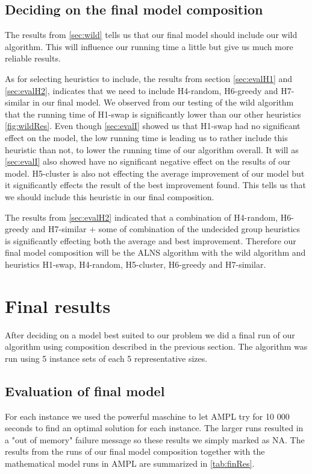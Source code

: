 \documentclass[../main.tex]{subfiles}
\begin{document}
\subsection{Deciding on the final model composition}
\label{sec:finComp}
The results from \cref{sec:wild} tells us that our final model should include our wild algorithm. 
This will influence our running time a little but give us much more reliable results.
\par
As for selecting heuristics to include, the results from section \cref{sec:evalH1} and \cref{sec:evalH2}, indicates that we need to include H4-random, H6-greedy and H7-similar in our final model.
We observed from our testing of the wild algorithm that the running time of H1-swap is significantly lower than our other heuristics \cref{fig:wildRes}. Even though \cref{sec:evalI} showed us that H1-swap had no significant effect on the model, the low running time is leading us to rather include this heuristic than not, to lower the running time of our algorithm overall.
It will as \cref{sec:evalI} also showed have no significant negative effect on the results of our model.
H5-cluster is also not effecting the average improvement of our model but it significantly effects the result of the best improvement found. This tells us that we should include this heuristic in our final composition. \par
The results from \cref{sec:evalH2} indicated that a combination of H4-random, H6-greedy and H7-similar + some of combination of the undecided group heuristics is significantly effecting both the average and best improvement. Therefore our final model composition will be the ALNS algorithm with the wild algorithm and heuristics H1-swap, H4-random, H5-cluster, H6-greedy and H7-similar.

\section{Final results}
\label{sec:evalFin}
After deciding on a model best suited to our problem we did a final run of our algorithm using composition described in the previous section.
The algorithm was run using 5 instance sets of each 5 representative sizes. 
\subsection{Evaluation of final model}
\label{sec:finRes}
For each instance we used the powerful maschine to let AMPL try for 10 000 seconds to find an optimal solution for each instance. 
The larger runs resulted in a "out of memory" failure message so these results we simply marked as NA.
The results from the runs of our final model composition together with the mathematical model runs in AMPL are summarized in \cref{tab:finRes}. 
\end{document}
